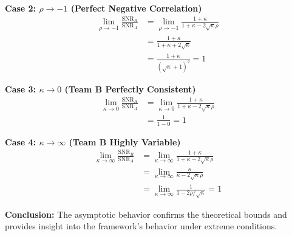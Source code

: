 \textbf{Case 2: $\rho \to -1$ (Perfect Negative Correlation)}
\begin{align}
\lim_{\rho \to -1} \frac{\text{SNR}_R}{\text{SNR}_A} &= \lim_{\rho \to -1} \frac{1 + \kappa}{1 + \kappa - 2\sqrt{\kappa}\rho} \\
&= \frac{1 + \kappa}{1 + \kappa + 2\sqrt{\kappa}} \\
&= \frac{1 + \kappa}{(\sqrt{\kappa} + 1)^2} = 1
\end{align}

\textbf{Case 3: $\kappa \to 0$ (Team B Perfectly Consistent)}
\begin{align}
\lim_{\kappa \to 0} \frac{\text{SNR}_R}{\text{SNR}_A} &= \lim_{\kappa \to 0} \frac{1 + \kappa}{1 + \kappa - 2\sqrt{\kappa}\rho} \\
&= \frac{1}{1 - 0} = 1
\end{align}

\textbf{Case 4: $\kappa \to \infty$ (Team B Highly Variable)}
\begin{align}
\lim_{\kappa \to \infty} \frac{\text{SNR}_R}{\text{SNR}_A} &= \lim_{\kappa \to \infty} \frac{1 + \kappa}{1 + \kappa - 2\sqrt{\kappa}\rho} \\
&= \lim_{\kappa \to \infty} \frac{\kappa}{\kappa - 2\sqrt{\kappa}\rho} \\
&= \lim_{\kappa \to \infty} \frac{1}{1 - 2\rho/\sqrt{\kappa}} = 1
\end{align}

\textbf{Conclusion:} The asymptotic behavior confirms the theoretical bounds and provides insight into the framework's behavior under extreme conditions.
